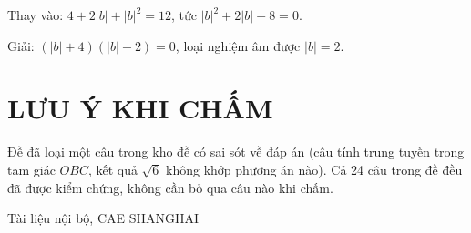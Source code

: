 \documentclass[11pt, a4paper]{article}
\begin{document}
Thay vào: $4 + 2\lvert b \rvert + \lvert b \rvert^2 = 12$, tức $\lvert b \rvert^2 + 2\lvert b \rvert - 8 = 0$.

Giải: $(\lvert b \rvert + 4)(\lvert b \rvert - 2) = 0$, loại nghiệm âm được $\lvert b \rvert = 2$.

\section{LƯU Ý KHI CHẤM}

Đề đã loại một câu trong kho đề có sai sót về đáp án (câu tính trung tuyến trong tam giác $OBC$, kết quả $\sqrt{6}$ không khớp phương án nào). Cả 24 câu trong đề đều đã được kiểm chứng, không cần bỏ qua câu nào khi chấm.
\vspace{0.8cm}
\begin{center}
{\footnotesize\color{cae_blue} Tài liệu nội bộ, CAE SHANGHAI}
\end{center}
\end{document}
